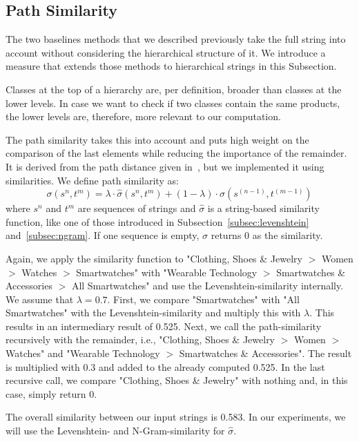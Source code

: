 \subsection{Path Similarity}
\label{subsec:path-similarity}

The two baselines methods that we described previously take the full string into account without considering
the hierarchical structure of it.
We introduce a measure that extends those methods to hierarchical strings in this Subsection.

Classes at the top of a hierarchy are, per definition, broader than classes at the lower levels.
In case we want to check if two classes contain the same products, the lower levels are, therefore, more
relevant to our computation.

The path similarity takes this into account and puts high weight on the comparison of the last elements while
reducing the importance of the remainder.
It is derived from the path distance given in~\cite[p. 95]{euzenat2007ontology}, but we implemented it using
similarities.
We define path similarity as:
\begin{equation*}
    \sigma(s^n, t^m) = \lambda \cdot \hat{\sigma}(s^n, t^m) + (1 - \lambda) \cdot \sigma(s^{(n-1)}, t^{(m-1)})
\end{equation*}
where $s^n$ and $t^m$ are sequences of strings and $\hat{\sigma}$ is a string-based similarity function, like one of
those introduced in Subsection~\ref{subsec:levenshtein} and~\ref{subsec:ngram}.
If one sequence is empty, $\sigma$ returns 0 as the similarity.

Again, we apply the similarity function to "Clothing, Shoes \& Jewelry $>$ Women $>$ Watches $>$ Smartwatches" with
"Wearable Technology $>$ Smartwatches \& Accessories $>$ All Smartwatches" and use the Levenshtein-similarity internally.
We assume that $\lambda = 0.7$.
First, we compare "Smartwatches" with "All Smartwatches" with the Levenshtein-similarity and multiply this with $\lambda$.
This results in an intermediary result of 0.525.
Next, we call the path-similarity recursively with the remainder, i.e., "Clothing, Shoes \& Jewelry $>$ Women $>$ Watches"
and "Wearable Technology $>$ Smartwatches \& Accessories".
The result is multiplied with 0.3 and added to the already computed 0.525.
In the last recursive call, we compare "Clothing, Shoes \& Jewelry" with nothing and, in this case, simply return 0.

The overall similarity between our input strings is 0.583.
In our experiments, we will use the Levenshtein- and N-Gram-similarity for $\hat{\sigma}$.

